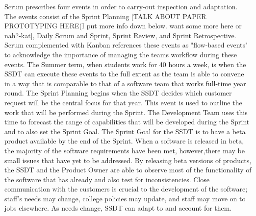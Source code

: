 Scrum prescribes four events in order to carry-out inspection and adaptation. The events consist of the Sprint Planning [TALK ABOUT PAPER PROTOTYPING HERE(I put more info down below. want some more here or nah?-kat], Daily Scrum and Sprint, Sprint Review, and Sprint Retrospective. Scrum complemented with Kanban references these events as "flow-based events" to acknowledge the importance of managing the teams workflow during these events. The Summer term, when students work for 40 hours a week, is when the SSDT can execute these events to the full extent as the team is able to convene in a way that is comparable to that of a software team that works full-time year round. The Sprint Planning begins when the SSDT decides which customer request will be the central focus for that year. This event is used to outline the work that will be performed during the Sprint. The Development Team uses this time to forecast the range of capabilities that will be developed during the Sprint and to also set the Sprint Goal. The Sprint Goal for the SSDT is to have a beta product available by the end of the Sprint.  When a software is released in beta, the majority of the software requirements have been met, however,there may be small issues that have yet to be addressed.  By releasing beta versions of products, the SSDT and the Product Owner are able to observe most of the functionality of the software that has already and also test for inconsistencies. Close communication with the customers is crucial to the development of the software; staff's needs may change, college policies may update, and staff may move on to jobs elsewhere. As needs change, SSDT can adapt to and account for them.

